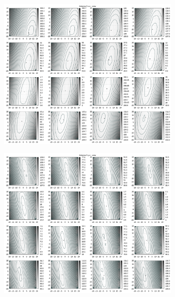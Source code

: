 \begin{appendix}
\begin{figure}[!ht]
\begin{subfigure}[t]{0.3\textwidth}
	\end{subfigure}
	\begin{subfigure}[t]{0.3\textwidth}
		\centering
	     \includegraphics[width=\textwidth]{img/fitness/xz/a5.png}
	\end{subfigure}
	\begin{subfigure}[t]{0.3\textwidth}
			\centering
	   \includegraphics[width=\textwidth]{img/fitness/yz/a5.png}

\end{subfigure}
\end{figure}
\end{appendix}
